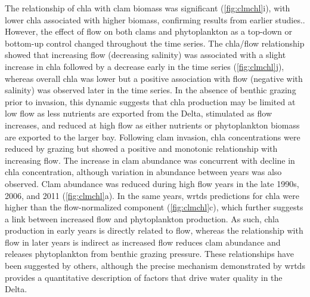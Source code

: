 \documentclass[letterpaper,12pt,oneside]{article}\usepackage[]{graphicx}\usepackage[]{color}
\begin{document}
The relationship of \ac{chla} with clam biomass was significant (\cref{fig:clmchl}i), with lower \ac{chla} associated with higher biomass, confirming results from earlier studies.\cite{Alpine92,Thompson08}.  However, the effect of flow on both clams and phytoplankton as a top-down or bottom-up control changed throughout the time series.  The \ac{chla}/flow relationship showed that increasing flow (decreasing salinity) was associated with a slight increase in \ac{chla} followed by a decrease early in the time series (\cref{fig:clmchl}j), whereas overall \ac{chla} was lower but a positive association with flow (negative with salinity) was observed later in the time series. In the absence of benthic grazing prior to invasion, this dynamic suggests that \ac{chla} production may be limited at low flow as less nutrients are exported from the Delta, stimulated as flow increases, and reduced at high flow as either nutrients or phytoplankton biomass are exported to the larger bay. Following clam invasion, \ac{chla} concentrations were reduced by grazing but showed a positive and monotonic relationship with increasing flow. The increase in clam abundance was concurrent with decline in \ac{chla} concentration, although variation in abundance between years was also observed.  Clam abundance was reduced during high flow years in the late 1990s, 2006, and 2011 (\ref{fig:clmchl}a). In the same years, \ac{wrtds} predictions for \ac{chla} were higher than the flow-normalized component (\cref{fig:clmchl}c), which further suggests a link between increased flow and phytoplankton production.  As such, \ac{chla} production in early years is directly related to flow, whereas the relationship with flow in later years is indirect as increased flow reduces clam abundance and releases phytoplankton from benthic grazing pressure. These relationships have been suggested by others\cite{Alpine92,Parchaso02,Jassby08}, although the precise mechanism demonstrated by \ac{wrtds} provides a quantitative description of factors that drive water quality in the Delta.
\end{document}
